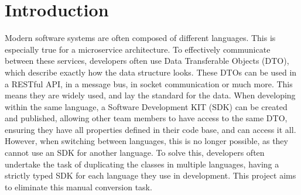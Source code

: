 \section{Introduction \label{sec:introduction}}
Modern software systems are often composed of different languages. This is especially true for a microservice architecture. To effectively communicate between these services, developers often use Data Transferable Objects (DTO), which describe exactly how the data structure looks. These DTOs can be used in a RESTful API, in a message bus, in socket communication or much more. This means they are widely used, and lay the standard for the data.
When developing within the same language, a Software Development KIT (SDK) can be created and published, allowing other team members to have access to the same DTO, ensuring they have all properties defined in their code base, and can access it all.
However, when switching between languages, this is no longer possible, as they cannot use an SDK for another language. To solve this, developers often undertake the task of duplicating the classes in multiple languages, having a strictly typed SDK for each language they use in development. 
This project aims to eliminate this manual conversion task.

